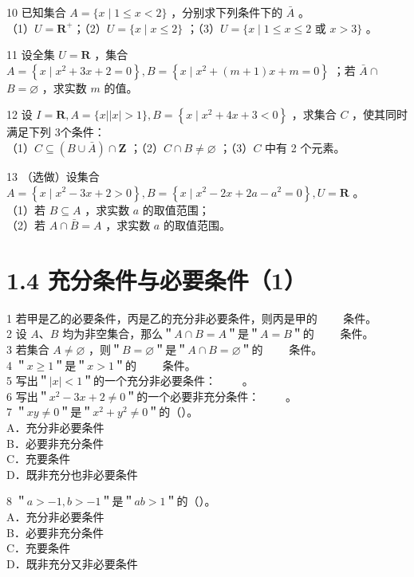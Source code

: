 \documentclass[10pt]{article}
\begin{document}
10 已知集合 \(A=\{x \mid 1 \leqslant x<2\}\) ，分别求下列条件下的 \(\bar{A}\) 。\\
（1）\(U=\mathbf{R}^{+}\)；（2）\(U=\{x \mid x \leqslant 2\}\) ；（3）\(U=\{x \mid 1 \leqslant x \leqslant 2\) 或 \(x>3\}\) 。

11 设全集 \(U=\mathbf{R}\) ，集合 \(A=\left\{x \mid x^{2}+3 x+2=0\right\}, B=\left\{x \mid x^{2}+(m+1) x+m=0\right\}\) ；若 \(\bar{A} \cap\) \(B=\varnothing\) ，求实数 \(m\) 的值。

12 设 \(I=\mathbf{R}, A=\{x| | x \mid>1\}, B=\left\{x \mid x^{2}+4 x+3<0\right\}\) ，求集合 \(C\) ，使其同时满足下列 3个条件：\\
（1）\(C \subseteq(B \cup \bar{A}) \cap \mathbf{Z}\) ；（2）\(C \cap B \neq \varnothing\) ；（3）\(C\) 中有 2 个元素。

13 （选做）设集合 \(A=\left\{x \mid x^{2}-3 x+2>0\right\}, B=\left\{x \mid x^{2}-2 x+2 a-a^{2}=0\right\}, U=\mathbf{R}\) 。\\
（1）若 \(B \subseteq A\) ，求实数 \(a\) 的取值范围；\\
（2）若 \(A \cap \bar{B}=A\) ，求实数 \(a\) 的取值范围。

\section*{1.4 充分条件与必要条件（1）}
1 若甲是乙的必要条件，丙是乙的充分非必要条件，则丙是甲的 \(\qquad\)条件。\\
2 设 \(A 、 B\) 均为非空集合，那么＂\(A \cap B=A\)＂是＂\(A=B\)＂的 \(\qquad\)条件。\\
3 若集合 \(A \neq \varnothing\) ，则＂\(B=\varnothing\)＂是＂\(A \cap B=\varnothing\)＂的 \(\qquad\)条件。\\
4 ＂\(x \geqslant 1\)＂是＂\(x>1\)＂的 \(\qquad\)条件。\\
5 写出＂\(|x|<1\)＂的一个充分非必要条件： \(\qquad\)。\\
6 写出＂\(x^{2}-3 x+2 \neq 0\)＂的一个必要非充分条件： \(\qquad\)。\\
7 ＂\(x y \neq 0\)＂是＂\(x^{2}+y^{2} \neq 0\)＂的（）。\\
A．充分非必要条件\\
B．必要非充分条件\\
C．充要条件\\
D．既非充分也非必要条件

8 ＂\(a>-1, b>-1\)＂是＂\(a b>1\)＂的（）。\\
A．充分非必要条件\\
B．必要非充分条件\\
C．充要条件\\
D．既非充分又非必要条件
\end{document}
